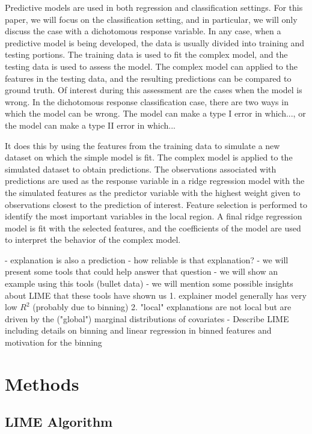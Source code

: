 \documentclass[AMS,STIX1COL]{WileyNJD-v2}
\begin{document}
Predictive models are used in both regression and classification settings. For this paper, we will focus on the classification setting, and in particular, we will only discuss the case with a dichotomous response variable. In any case, when a predictive model is being developed, the data is usually divided into training and testing portions. The training data is used to fit the complex model, and the testing data is used to assess the model. The complex model can applied to the features in the testing data, and the resulting predictions can be compared to ground truth. Of interest during this assessment are the cases when the model is wrong. In the dichotomous response classification case, there are two ways in which the model can be wrong. The model can make a type I error in which..., or the model can make a type II error in which...

It does this by using the features from the training data to simulate a new dataset on which the simple model is fit. The complex model is applied to the simulated dataset to obtain predictions. The observations associated with predictions are used as the response variable in a ridge regression model with the the simulated features as the predictor variable with the highest weight given to observations closest to the prediction of interest. Feature selection is performed to identify the most important variables in the local region. A final ridge regression model is fit with the selected features, and the coefficients of the model are used to interpret the behavior of the complex model.

- explanation is also a prediction
  - how reliable is that explanation?
- we will present some tools that could help answer that question
- we will show an example using this tools (bullet data)
- we will mention some possible insights about LIME that these tools have shown us
1. explainer model generally has very low $R^2$ (probably due to binning)
2. "local" explanations are not local but are driven by the ("global") marginal distributions of covariates 
- Describe LIME including details on binning and linear regression in binned features and motivation for the binning

\section{Methods}

\subsection{LIME Algorithm}
\end{document}
